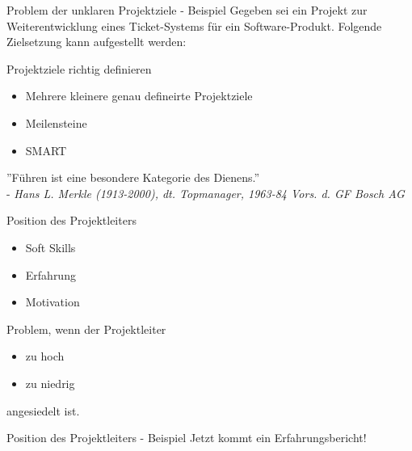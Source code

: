 \documentclass[12pt]{beamer}
\begin{document}
	\begin{frame}{Problem der unklaren Projektziele - Beispiel}
		Gegeben sei ein Projekt zur Weiterentwicklung eines Ticket-Systems für ein Software-Produkt. Folgende Zielsetzung kann aufgestellt werden: \\

		
	\end{frame}

	\begin{frame}{Projektziele richtig definieren}
		\begin{itemize}
			\item{Mehrere kleinere genau defineirte Projektziele}
			\item{Meilensteine}
			\item{SMART}
		\end{itemize}
	\end{frame}

	\thispagestyle{empty}
	\begin{frame}
		''Führen ist eine besondere Kategorie des Dienens.''\\
		 - \textit{Hans L. Merkle (1913-2000), dt. Topmanager, 1963-84 Vors. d. GF Bosch AG}
	\end{frame}

	\begin{frame}{Position des Projektleiters}
		\begin{itemize}
			\item{Soft Skills}
			\item{Erfahrung}
			\item{Motivation}
		\end{itemize}

		Problem, wenn der Projektleiter
		\begin{itemize}
			\item{zu hoch}
			\item{zu niedrig} 
		\end{itemize}
		angesiedelt ist.
		
	\end{frame}

	\begin{frame}{Position des Projektleiters - Beispiel}
		Jetzt kommt ein Erfahrungsbericht!
	\end{frame}
\end{document}

